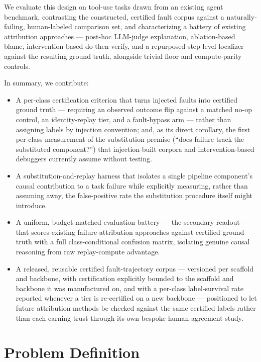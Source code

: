 \documentclass[11pt]{article}
\begin{document}
We evaluate this design on tool-use tasks drawn from an existing agent benchmark, contrasting the constructed, certified fault corpus against a naturally-failing, human-labeled comparison set, and characterizing a battery of existing attribution approaches --- post-hoc LLM-judge explanation, ablation-based blame, intervention-based do-then-verify, and a repurposed step-level localizer --- against the resulting ground truth, alongside trivial floor and compute-parity controls.

In summary, we contribute:
\begin{itemize}[leftmargin=1.4em]
\item A per-class certification criterion that turns injected faults into certified ground truth --- requiring an observed outcome flip against a matched no-op control, an identity-replay tier, and a fault-bypass arm --- rather than assigning labels by injection convention; and, as its direct corollary, the first per-class measurement of the substitution premise (``does failure track the substituted component?'') that injection-built corpora and intervention-based debuggers currently assume without testing.
\item A substitution-and-replay harness that isolates a single pipeline component's causal contribution to a task failure while explicitly measuring, rather than assuming away, the false-positive rate the substitution procedure itself might introduce.
\item A uniform, budget-matched evaluation battery --- the secondary readout --- that scores existing failure-attribution approaches against certified ground truth with a full class-conditional confusion matrix, isolating genuine causal reasoning from raw replay-compute advantage.
\item A released, reusable certified fault-trajectory corpus --- versioned per scaffold and backbone, with certification explicitly bounded to the scaffold and backbone it was manufactured on, and with a per-class label-survival rate reported whenever a tier is re-certified on a new backbone --- positioned to let future attribution methods be checked against the same certified labels rather than each earning trust through its own bespoke human-agreement study.
\end{itemize}

\section{Problem Definition}
\end{document}
